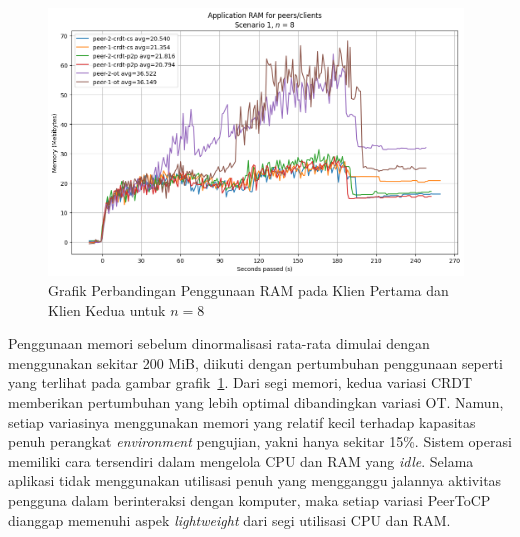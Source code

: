 \begin{figure}
 \centering
 \includegraphics[width=11cm]{./assets/skripsi/benchmark-vis_cell_2_output_21}
 \caption{Grafik Perbandingan Penggunaan RAM pada Klien Pertama dan Klien Kedua untuk $n = 8$}
 \label{fig:2-21}
\end{figure}

Penggunaan memori sebelum dinormalisasi rata-rata dimulai dengan menggunakan sekitar 200 MiB, diikuti dengan pertumbuhan penggunaan seperti yang terlihat pada gambar grafik~\ref{fig:2-21}. Dari segi memori, kedua variasi CRDT memberikan pertumbuhan yang lebih optimal dibandingkan variasi OT. Namun, setiap variasinya menggunakan memori yang relatif kecil terhadap kapasitas penuh perangkat \textit{environment} pengujian, yakni hanya sekitar 15\%. Sistem operasi memiliki cara tersendiri dalam mengelola CPU dan RAM yang \textit{idle}. Selama aplikasi tidak menggunakan utilisasi penuh yang mengganggu jalannya aktivitas pengguna dalam berinteraksi dengan komputer, maka setiap variasi PeerToCP dianggap memenuhi aspek \textit{lightweight} dari segi utilisasi CPU dan RAM.

